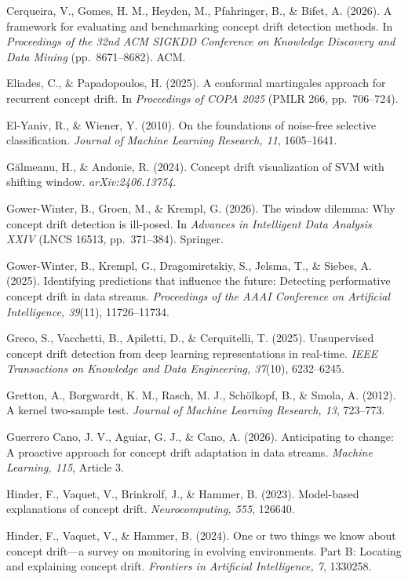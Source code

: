 \documentclass[
]{article}
\begin{document}
Cerqueira, V., Gomes, H. M., Heyden, M., Pfahringer, B., \& Bifet, A.
(2026). A framework for evaluating and benchmarking concept drift
detection methods. In \emph{Proceedings of the 32nd ACM SIGKDD
Conference on Knowledge Discovery and Data Mining} (pp.~8671--8682).
ACM.

Eliades, C., \& Papadopoulos, H. (2025). A conformal martingales
approach for recurrent concept drift. In \emph{Proceedings of COPA 2025}
(PMLR 266, pp.~706--724).

El-Yaniv, R., \& Wiener, Y. (2010). On the foundations of noise-free
selective classification. \emph{Journal of Machine Learning Research,
11}, 1605--1641.

Gălmeanu, H., \& Andonie, R. (2024). Concept drift visualization of SVM
with shifting window. \emph{arXiv:2406.13754}.

Gower-Winter, B., Groen, M., \& Krempl, G. (2026). The window dilemma:
Why concept drift detection is ill-posed. In \emph{Advances in
Intelligent Data Analysis XXIV} (LNCS 16513, pp.~371--384). Springer.

Gower-Winter, B., Krempl, G., Dragomiretskiy, S., Jelsma, T., \& Siebes,
A. (2025). Identifying predictions that influence the future: Detecting
performative concept drift in data streams. \emph{Proceedings of the
AAAI Conference on Artificial Intelligence, 39}(11), 11726--11734.

Greco, S., Vacchetti, B., Apiletti, D., \& Cerquitelli, T. (2025).
Unsupervised concept drift detection from deep learning representations
in real-time. \emph{IEEE Transactions on Knowledge and Data Engineering,
37}(10), 6232--6245.

Gretton, A., Borgwardt, K. M., Rasch, M. J., Schölkopf, B., \& Smola, A.
(2012). A kernel two-sample test. \emph{Journal of Machine Learning
Research, 13}, 723--773.

Guerrero Cano, J. V., Aguiar, G. J., \& Cano, A. (2026). Anticipating to
change: A proactive approach for concept drift adaptation in data
streams. \emph{Machine Learning, 115}, Article 3.

Hinder, F., Vaquet, V., Brinkrolf, J., \& Hammer, B. (2023). Model-based
explanations of concept drift. \emph{Neurocomputing, 555}, 126640.

Hinder, F., Vaquet, V., \& Hammer, B. (2024). One or two things we know
about concept drift---a survey on monitoring in evolving environments.
Part B: Locating and explaining concept drift. \emph{Frontiers in
Artificial Intelligence, 7}, 1330258.
\end{document}
